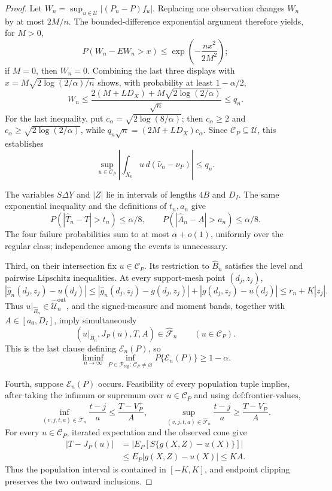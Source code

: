 \documentclass{article}
\begin{document}
\begin{proof}
Let \(W_n=\sup_{u\in\mathcal U}|(P_n-P)f_u|\).  Replacing one observation changes \(W_n\) by at most \(2M/n\).  The bounded-difference exponential argument therefore yields, for \(M>0\),
\[
 P(W_n-EW_n>x)\leq\exp\!\left(-\frac{nx^2}{2M^2}\right);
\]
if \(M=0\), then \(W_n=0\).  Combining the last three displays with \(x=M\sqrt{2\log(2/\alpha)/n}\) shows, with probability at least \(1-\alpha/2\),
\[
 W_n\leq\frac{2(M+LD_X)+M\sqrt{2\log(2/\alpha)}}{\sqrt n}\leq q_n.
\]
For the last inequality, put \(c_\alpha=\sqrt{2\log(8/\alpha)}\); then \(c_\alpha\geq2\) and \(c_\alpha\geq\sqrt{2\log(2/\alpha)}\), while \(q_n\sqrt n=(2M+LD_X)c_\alpha\).  Since \(\mathcal C_P\subseteq\mathcal U\), this establishes
\[
 \sup_{u\in\mathcal C_P}
 \left|\int_{X_0}u\,d(\widehat\nu_n-\nu_P)\right|\leq q_n.
\]

The variables \(S\Delta Y\) and \(|Z|\) lie in intervals of lengths \(4B\) and \(D_I\).  The same exponential inequality and the definitions of \(t_n,a_n\) give
\[
 P(|\widehat T_n-T|>t_n)\leq\alpha/8,
 \qquad
 P(|\widehat A_n-A|>a_n)\leq\alpha/8.
\]
The four failure probabilities sum to at most \(\alpha+o(1)\), uniformly over the regular class; independence among the events is unnecessary.

Third, on their intersection fix \(u\in\mathcal C_P\).  Its restriction to \(\widehat B_n\) satisfies the level and pairwise Lipschitz inequalities.  At every support-mesh point \((d_j,z_j)\),
\[
 |\widehat g_n(d_j,z_j)-u(d_j)|
 \leq|\widehat g_n(d_j,z_j)-g(d_j,z_j)|+|g(d_j,z_j)-u(d_j)|
 \leq r_n+K|z_j|.
\]
Thus \(u|_{\widehat B_n}\in\widehat{\mathcal U}_n^{\mathrm{out}}\), and the signed-measure and moment bands, together with \(A\in[a_0,D_I]\), imply simultaneously
\[
 (u|_{\widehat B_n},J_P(u),T,A)\in\widehat{\mathscr F}_n
 \qquad(u\in\mathcal C_P).
\]
This is the last clause defining \(\mathcal E_n(P)\), so
\[
 \liminf_{n\to\infty}\inf_{P\in\mathcal P_{\mathrm{reg}}:\,\mathcal C_P\neq\varnothing}
 P\{\mathcal E_n(P)\}\geq1-\alpha.
\]

Fourth, suppose \(\mathcal E_n(P)\) occurs.  Feasibility of every population tuple implies, after taking the infimum or supremum over \(u\in\mathcal C_P\) and using \(\text{def:frontier-values}\),
\[
 \inf_{(v,j,t,a)\in\widehat{\mathscr F}_n}\frac{t-j}{a}
 \leq\frac{T-V_P^+}{A},
 \qquad
 \sup_{(v,j,t,a)\in\widehat{\mathscr F}_n}\frac{t-j}{a}
 \geq\frac{T-V_P^-}{A}.
\]
For every \(u\in\mathcal C_P\), iterated expectation and the observed cone give
\[
 \begin{aligned}
 |T-J_P(u)|
 &=\left|E_P[S\{g(X,Z)-u(X)\}]\right|\\
 &\leq E_P|g(X,Z)-u(X)|\leq KA.
 \end{aligned}
\]
Thus the population interval is contained in \([-K,K]\), and endpoint clipping preserves the two outward inclusions.


\end{proof}
\end{document}
